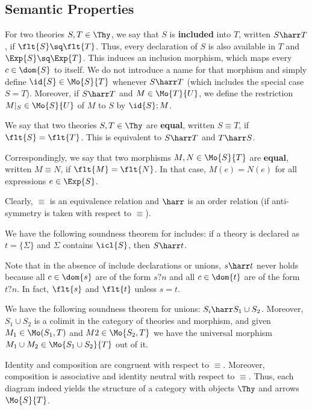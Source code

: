 \subsection{Semantic Properties}

For two theories $S,T\in\Thy$, we say that $S$ is \textbf{included} into $T$, written $S\harr T$, if $\flt{S}\sq\flt{T}$.
Thus, every declaration of $S$ is also available in $T$ and $\Exp{S}\sq\Exp{T}$.
This induces an inclusion morphism, which maps every $c\in\dom{S}$ to itself.
We do not introduce a name for that morphism and simply define $\id{S}\in\Mo{S}{T}$ whenever $S\harr T$ (which includes the special case $S=T$).
Moreover, if $S\harr T$ and $M\in\Mo{T}{U}$, we define the restriction $M|_S\in\Mo{S}{U}$ of $M$ to $S$ by $\id{S};M$.

We say that two theories $S,T\in\Thy$ are \textbf{equal}, written $S\equiv T$, if $\flt{S}=\flt{T}$.
This is equivalent to $S\harr T$ and $T\harr S$.

Correspondingly, we say that two morphisms $M,N\in\Mo{S}{T}$ are \textbf{equal}, written $M\equiv N$, if $\flt{M}=\flt{N}$.
In that case, $M(e)=N(e)$ for all expressions $e\in\Exp{S}$.

Clearly, $\equiv$ is an equivalence relation and $\harr$ is an order relation (if anti-symmetry is taken with respect to $\equiv$).

\begin{example}\label{rel:incl}
We have the following soundness theorem for includes: if a theory is declared as $t=\{\Sigma\}$ and $\Sigma$ contains $\icl{S}$, then $S\harr t$.

Note that in the absence of include declarations or unions, $s\harr t$ never holds because all $c\in\dom{s}$ are of the form $s?n$ and all $c\in\dom{t}$ are of the form $t?n$.
In fact, $\flt{s}$ and $\flt{t}$ unless $s=t$.
\end{example}

\begin{example}\label{rel:union}
We have the following soundness theorem for unions: $S_i\harr S_1\cup S_2$.
Moreover, $S_1\cup S_2$ is a colimit in the category of theories and morphism, and given $M_1\in\Mo(S_1,T)$ and $M2\in\Mo{S_2,T}$ we have the universal morphism $M_1\cup M_2\in\Mo{S_1\cup S_2}{T}$ out of it.
\end{example}

\begin{example}\label{rel:cat}
Identity and composition are congruent with respect to $\equiv$.
Moreover, composition is associative and identity neutral with respect to $\equiv$.
Thus, each diagram indeed yields the structure of a category with objects $\Thy$ and arrows $\Mo{S}{T}$.
\end{example}
